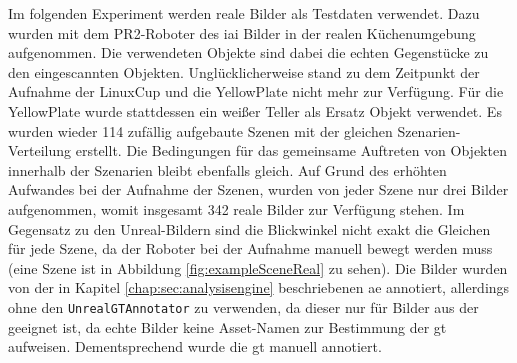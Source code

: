 Im folgenden Experiment werden reale Bilder als Testdaten verwendet. Dazu wurden mit dem PR2-Roboter des \gls{iai} Bilder in der realen Küchenumgebung aufgenommen. Die verwendeten Objekte sind dabei die echten Gegenstücke zu den eingescannten Objekten. Unglücklicherweise stand zu dem Zeitpunkt der Aufnahme der LinuxCup und die YellowPlate nicht mehr zur Verfügung. Für die YellowPlate wurde stattdessen ein weißer Teller als Ersatz Objekt verwendet. Es wurden wieder 114 zufällig aufgebaute Szenen mit der gleichen Szenarien-Verteilung erstellt. Die Bedingungen für das gemeinsame Auftreten von Objekten innerhalb der Szenarien bleibt ebenfalls gleich. Auf Grund des erhöhten Aufwandes bei der Aufnahme der Szenen, wurden von jeder Szene nur drei Bilder aufgenommen, womit insgesamt 342 reale Bilder zur Verfügung stehen. Im Gegensatz zu den Unreal-Bildern sind die Blickwinkel nicht exakt die Gleichen für jede Szene, da der Roboter bei der Aufnahme manuell bewegt werden muss (eine Szene ist in Abbildung \ref{fig:exampleSceneReal} zu sehen). Die Bilder wurden von der in Kapitel \ref{chap:sec:analysisengine} beschriebenen \gls{ae} annotiert, allerdings ohne den \texttt{UnrealGTAnnotator} zu verwenden, da dieser nur für Bilder aus der \unreal geeignet ist, da echte Bilder keine Asset-Namen zur Bestimmung der \gls{gt} aufweisen. Dementsprechend wurde die \gls{gt} manuell annotiert.

